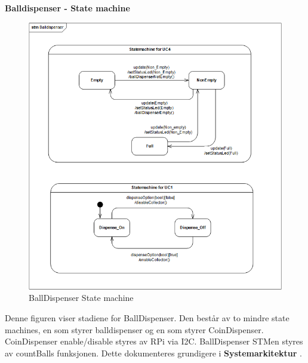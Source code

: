 \documentclass[Rapport/Rapport_main.tex]{subfiles}
\begin{document}
\textbf{Balldispenser - State machine}\\
\begin{figure}[H]
    \centering
    \includegraphics[width=\textwidth]{Arkitektur/Softwarearkitektur/Applikationsmodel/BallDispenser/graphicsBallDispenser/ApplikationsmodelBolddispenserstm.PNG}
    \caption{BallDispenser State machine}
    \label{fig:ball_dispenser_app_stm}
\end{figure}
Denne figuren viser stadiene for BallDispenser. Den består av to mindre state machines, en som styrer balldispenser og en som styrer CoinDispenser. CoinDispenser enable/disable styres av RPi via I2C. BallDispenser STMen styres av countBalls funksjonen. Dette dokumenteres grundigere i \textbf{Systemarkitektur} .
\end{document}

